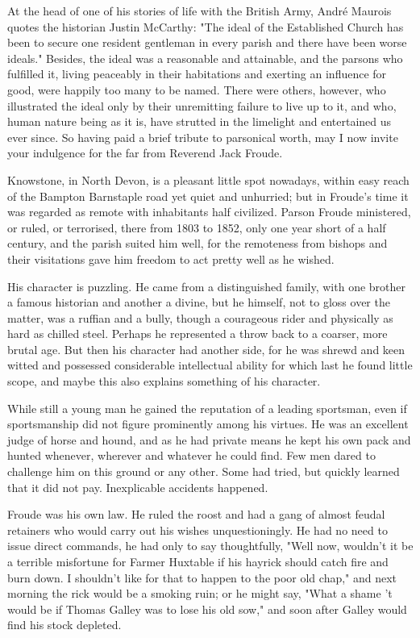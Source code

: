 
At the head of one of his stories of life with the British Army, André Maurois quotes the historian Justin McCarthy: "The ideal of the Established Church has been to secure one resident gentleman in every parish   and there have been worse ideals." 
 Besides, the ideal was a reasonable and attainable, and the parsons who fulfilled it, living peaceably in their habitations and exerting an influence for good, were happily too many to be named. There were others, however, who illustrated the ideal only by their unremitting failure to live up to it, and who, human nature being as it is, have strutted in the limelight and entertained us ever since. So having paid a brief tribute to parsonical worth, may I now invite your indulgence for the far from Reverend Jack Froude.

\Flourish 

Knowstone, in North Devon, is a pleasant little spot nowadays, within easy reach of the Bampton Barnstaple road yet quiet and unhurried; but in Froude's time it was regarded as remote with inhabitants half civilized. Parson Froude ministered, or ruled, or terrorised, there from 1803 to 1852, only one year short of a half century, and the parish suited him well, for the remoteness from bishops and their visitations gave him freedom to act pretty well as he wished.

His character is puzzling. He came from a distinguished family, with one brother a famous historian and another a divine, but he himself, not to gloss over the matter, was a ruffian and a bully, though a courageous rider and physically as hard as chilled steel. Perhaps he represented a throw back to a coarser, more brutal age. But then his character had another side, for he was shrewd and keen witted and possessed considerable intellectual ability   for which last he found little scope, and maybe this also explains something of his character.

While still a young man he gained the reputation of a leading sportsman, even if sportsmanship did not figure prominently among his virtues. He was an excellent judge of horse and hound, and as he had private means he kept his own pack and hunted whenever, wherever and whatever he could find. Few men dared to challenge him on this ground or any other. Some had tried, but quickly learned that it did not pay. Inexplicable accidents happened.

Froude was his own law. He ruled the roost and had a gang of almost feudal retainers who would carry out his wishes unquestioningly. He had no need to issue direct commands, he had only to say thoughtfully, "Well now, wouldn't it be a terrible misfortune for Farmer Huxtable if his hayrick should catch fire and burn down. I shouldn't like for that to happen to the poor old chap," and next morning the rick would be a smoking ruin; or he might say, "What a shame 't would be if Thomas Galley was to lose his old sow," and soon after Galley would find his stock depleted.

